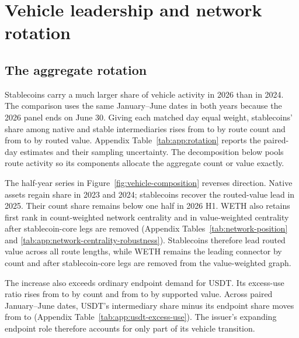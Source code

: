 
\section{Vehicle leadership and network rotation}
\label{sec:dominance}

\subsection{The aggregate rotation}
\label{sec:dominance:transition}

Stablecoins carry a much larger share of vehicle activity in 2026 than in 2024. The comparison uses the same January--June dates in both years because the 2026 panel ends on June 30. Giving each matched day equal weight, stablecoins' share among native and stable intermediaries rises from \StableCountBase{} to \StableCountEnd{} by route count and from \StableValueBase{} to \StableValueEnd{} by routed value. Appendix Table~\ref{tab:app:rotation} reports the paired-day estimates and their sampling uncertainty. The decomposition below pools route activity so its components allocate the aggregate count or value exactly.

The half-year series in Figure~\ref{fig:vehicle-composition} reverses direction. Native assets regain share in 2023 and 2024; stablecoins recover the routed-value lead in 2025. Their count share remains below one half in 2026 H1. WETH also retains first rank in count-weighted network centrality and in value-weighted centrality after stablecoin-core legs are removed (Appendix Tables~\ref{tab:network-position} and \ref{tab:app:network-centrality-robustness}). Stablecoins therefore lead routed value across all route lengths, while WETH remains the leading connector by count and after stablecoin-core legs are removed from the value-weighted graph.

The increase also exceeds ordinary endpoint demand for USDT. Its excess-use ratio rises from \USDTCountExcessBase{} to \USDTCountExcessEnd{} by count and from \USDTValueExcessBase{} to \USDTValueExcessEnd{} by supported value. Across paired January--June dates, USDT's intermediary share minus its endpoint share moves from \USDTEndpointGapBase{} to \USDTEndpointGapEnd{} (Appendix Table~\ref{tab:app:usdt-excess-use}). The issuer's expanding endpoint role therefore accounts for only part of its vehicle transition.

